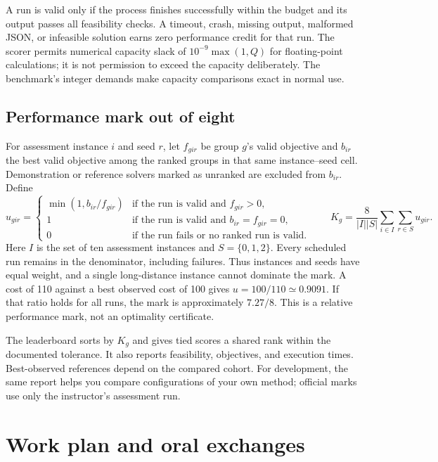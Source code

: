 \documentclass[11pt,a4paper]{article}
\begin{document}
A run is valid only if the process finishes successfully within the budget and its output passes all feasibility checks. A timeout, crash, missing output, malformed JSON, or infeasible solution earns zero performance credit for that run. The scorer permits numerical capacity slack of $10^{-9}\max(1,Q)$ for floating-point calculations; it is not permission to exceed the capacity deliberately. The benchmark's integer demands make capacity comparisons exact in normal use.

\subsection{Performance mark out of eight}

For assessment instance $i$ and seed $r$, let $f_{gir}$ be group $g$'s valid objective and $b_{ir}$ the best valid objective among the ranked groups in that same instance--seed cell. Demonstration or reference solvers marked as unranked are excluded from $b_{ir}$. Define
\[
u_{gir}=\begin{cases}
\min(1,b_{ir}/f_{gir}) &\text{if the run is valid and } f_{gir}>0,\\
1 &\text{if the run is valid and } b_{ir}=f_{gir}=0,\\
0 &\text{if the run fails or no ranked run is valid.}
\end{cases}
\qquad
K_g=\frac{8}{|I||S|}\sum_{i\in I}\sum_{r\in S}u_{gir}.
\]
Here $I$ is the set of ten assessment instances and $S=\{0,1,2\}$. Every scheduled run remains in the denominator, including failures. Thus instances and seeds have equal weight, and a single long-distance instance cannot dominate the mark. A cost of 110 against a best observed cost of 100 gives $u=100/110\simeq0.9091$. If that ratio holds for all runs, the mark is approximately $7.27/8$. This is a relative performance mark, not an optimality certificate.

The leaderboard sorts by $K_g$ and gives tied scores a shared rank within the documented tolerance. It also reports feasibility, objectives, and execution times. Best-observed references depend on the compared cohort. For development, the same report helps you compare configurations of your own method; official marks use only the instructor's assessment run.


\section{Work plan and oral exchanges}
\end{document}
